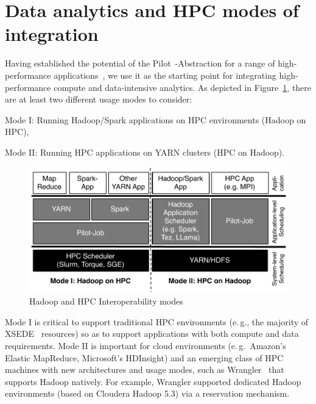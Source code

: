 \section{Data analytics and HPC modes of integration}
\label{sec:integration_mode}
Having established the potential of the Pilot~-Abstraction for a range of high-performance applications~\cite{treikalis2016repex,ragothaman2014developing,ko2014numerical}, we use it as the starting point for integrating high-performance compute and data-intensive analytics.
As depicted in Figure~\ref{fig:figures_hadoop-on-hpc-viceverse}, there are at least two different usage modes to consider:
\begin{inparaenum}[(i)]
    \item Mode I: Running Hadoop/Spark applications on HPC environments (Hadoop on HPC),
    \item Mode II: Running HPC applications on YARN clusters (HPC on Hadoop).
\end{inparaenum}

\begin{figure}[t]
    \centering
    \includegraphics[width=.95\textwidth]{figures/data_analytics_hpc/hpc_hadoop/hadoop-on-hpc-viceverse.pdf}
    \caption{Hadoop and HPC Interoperability modes\label{fig:figures_hadoop-on-hpc-viceverse}}
\end{figure}

Mode I is critical to support traditional HPC environments (e.\,g., the majority of XSEDE~\cite{xsede} resources) so as to support applications with both compute and data requirements.
Mode II is important for cloud environments (e.\,g.\ Amazon's Elastic MapReduce, Microsoft's HDInsight) and an emerging class of HPC machines with new architectures and usage modes, such as Wrangler~\cite{wrangler} that supports Hadoop natively.
For example, Wrangler supported dedicated Hadoop environments (based on Cloudera Hadoop 5.3) via a reservation mechanism.

